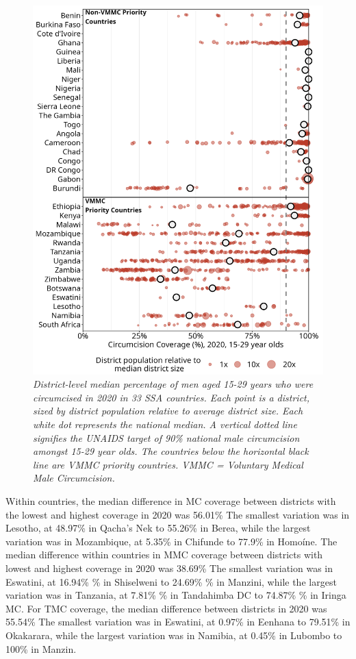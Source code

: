 \documentclass{article}
\begin{document}
\begin{figure}[H]
    \centering
    \includegraphics[width=.9\linewidth]
    {figures/paper/02_subnat_plot.png}
    \caption{\emph{District-level median percentage of men aged 15-29 years who were circumcised in 2020 in 33 SSA countries.
    Each point is a district, sized by district population relative to average district size.
    Each white dot represents the national median. 
    A vertical dotted line signifies the UNAIDS target of 90\% national male circumcision amongst 15-29 year olds. The countries below the horizontal black line are VMMC priority countries. VMMC = Voluntary Medical Male Circumcision.}}
\end{figure}

Within countries, the median difference in MC coverage between districts with the lowest and highest coverage in 2020 was 56.01\% The smallest variation was in Lesotho, at 48.97\% in Qacha’s Nek to 55.26\% in Berea, while the largest variation was in Mozambique, at 5.35\% in Chifunde to 77.9\% in Homoíne. 
The median difference within countries in MMC coverage between districts with lowest and highest coverage in 2020 was 38.69\% The smallest variation was in Eswatini, at 16.94\% \% in Shiselweni to 24.69\% \% in Manzini, while the largest variation was in Tanzania, at 7.81\% \% in Tandahimba DC to 74.87\% \% in Iringa MC. 
For TMC coverage, the median difference between districts in 2020 was 55.54\% The smallest variation was in Eswatini, at 0.97\% in Eenhana to 79.51\% in Okakarara, while the largest variation was in Namibia, at 0.45\% in Lubombo to 100\% in Manzin. 
\end{document}
